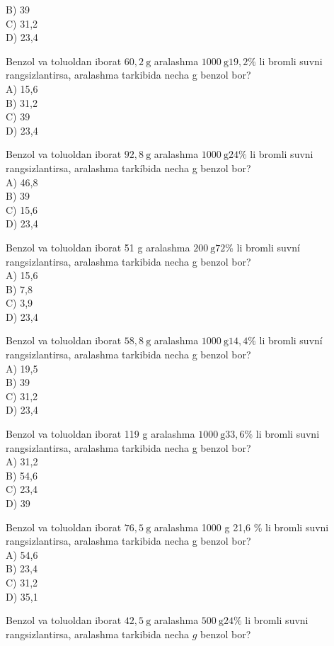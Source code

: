 B) 39\\
C) 31,2\\
D) 23,4
  \item Benzol va toluoldan iborat $60,2 \mathrm{~g}$ aralashma $1000 \mathrm{~g} 19,2 \%$ li bromli suvni rangsizlantirsa, aralashma tarkibida necha g benzol bor?\\
A) 15,6\\
B) 31,2\\
C) 39\\
D) 23,4
  \item Benzol va toluoldan iborat $92,8 \mathrm{~g}$ aralashma $1000 \mathrm{~g} 24 \%$ li bromli suvni\\
rangsizlantirsa, aralashma tarkíbida necha g benzol bor?\\
A) 46,8\\
B) 39\\
C) 15,6\\
D) 23,4
  \item Benzol va toluoldan iborat 51 g aralashma $200 \mathrm{~g} 72 \%$ li bromli suvní rangsizlantirsa, aralashma tarkibida necha g benzol bor?\\
A) 15,6\\
B) 7,8\\
C) 3,9\\
D) 23,4
  \item Benzol va toluoldan iborat $58,8 \mathrm{~g}$ aralashma $1000 \mathrm{~g} 14,4 \%$ li bromli suvní rangsizlantirsa, aralashma tarkibida necha g benzol bor?\\
A) 19,5\\
B) 39\\
C) 31,2\\
D) 23,4
  \item Benzol va toluoldan iborat 119 g aralashma $1000 \mathrm{~g} 33,6 \%$ li bromli suvni rangsizlantirsa, aralashma tarkibida necha g benzol bor?\\
A) 31,2\\
B) 54,6\\
C) 23,4\\
D) 39
  \item Benzol va toluoldan iborat $76,5 \mathrm{~g}$ aralashma 1000 g 21,6 \% li bromli suvni rangsizlantirsa, aralashma tarkibida necha g benzol bor?\\
A) 54,6\\
B) 23,4\\
C) 31,2\\
D) 35,1
  \item Benzol va toluoldan iborat $42,5 \mathrm{~g}$ aralashma $500 \mathrm{~g} 24 \%$ li bromli suvni rangsizlantirsa, aralashma tarkibida necha $g$ benzol bor?\\
